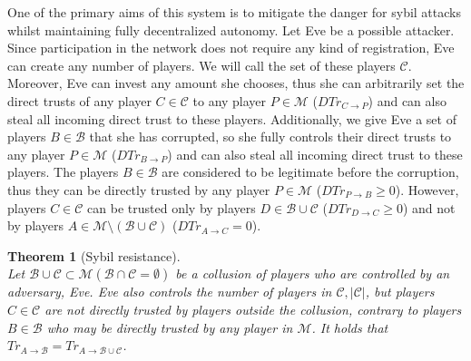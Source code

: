 \documentclass[11pt]{article}
\newtheorem{theorem}{Theorem}[section]
\theoremstyle{definition}
\theoremstyle{corollary}
\theoremstyle{lemma}
\begin{document}
    One of the primary aims of this system is to mitigate the danger for sybil attacks whilst maintaining fully decentralized
    autonomy. Let Eve be a possible attacker. Since participation in the network does not require any kind of registration,
    Eve can create any number of players. We will call the set of these players $\mathcal{C}$. Moreover, Eve can invest any
    amount she chooses, thus she can arbitrarily set the direct trusts of any player $C \in \mathcal{C}$ to any player $P \in
    \mathcal{M}$ ($DTr_{C \rightarrow P}$) and can also steal all incoming direct trust to these players. Additionally, we
    give Eve a set of players $B \in \mathcal{B}$ that she has corrupted, so she fully controls their direct trusts to any
    player $P \in \mathcal{M}$ ($DTr_{B \rightarrow P}$) and can also steal all incoming direct trust to these players. The
    players $B \in \mathcal{B}$ are considered to be legitimate before the corruption, thus they can be directly trusted by
    any player $P \in \mathcal{M}$ ($DTr_{P \rightarrow B} \geq 0$). However, players $C \in \mathcal{C}$ can be trusted only
    by players $D \in \mathcal{B} \cup \mathcal{C}$ ($DTr_{D \rightarrow C} \geq 0$) and not by players $A \in \mathcal{M}
    \setminus (\mathcal{B} \cup \mathcal{C})$ ($DTr_{A \rightarrow C} = 0$).
    \begin{theorem}[Sybil resistance] \ \\
    \label{sybil}
       Let $\mathcal{B} \cup \mathcal{C} \subset \mathcal{M} (\mathcal{B} \cap \mathcal{C} = \emptyset)$ be a collusion of
       players who are controlled by an adversary, Eve. Eve also controls the number of players in $\mathcal{C},
       |\mathcal{C}|$, but players $C \in \mathcal{C}$ are not directly trusted by players outside the collusion, contrary
       to players $B \in \mathcal{B}$ who may be directly trusted by any player in $\mathcal{M}$. It holds that
       $Tr_{A \rightarrow \mathcal{B}} = Tr_{A \rightarrow \mathcal{B} \cup \mathcal{C}}$.
    \end{theorem}
\end{document}
